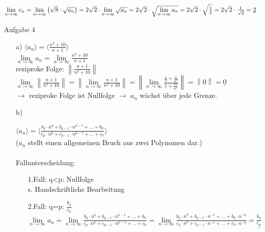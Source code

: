 \documentclass{scrreprt}
\begin{document}
\begin{enumerate}
{\begin{enumerate}
{                    $\lim \limits_{n \to \infty} c_n =
                    \lim \limits_{n \to \infty} \left( \sqrt{8} \cdot \sqrt{a_n}\right) =\\
                    2\sqrt{2} \cdot \lim \limits_{n \to \infty} \sqrt{a_n} =
                    2\sqrt{2} \cdot \sqrt{ \lim \limits_{n \to \infty} a_n } =\\
                    2\sqrt{2} \cdot \sqrt{\frac{1}{2}} =
                    2\sqrt{2} \cdot \frac{1}{\sqrt{2}} =
                    \underline{2}$\\
                }
            \end{enumerate}
        }\newpage
        \item[Aufgabe 4]{
            \begin{enumerate}
                \item [a)]{
                    $\langle a_n \rangle = \langle \frac{n^2 + 10}{n+1} \rangle$\\
                    $\lim \limits_{n \to \infty} a_n =
                    \lim \limits_{n \to \infty} \frac{n^2 + 10}{n+1}$\\
                    reziproke Folge: $\left\| \frac{n+1}{n^2 +10} \right\|$\\
                    $\lim \limits_{n \to \infty} \left\| \frac{n+1}{n^2 +10} \right\| =
                    \left\| \lim \limits_{n \to \infty} \frac{n+1}{n^2 +10} \right\| =
                    \left\| \lim \limits_{n \to \infty} \frac{\frac{1}{n}+\frac{1}{n^2}}{1 + \frac{10}{n^2}} \right\| =
                    \left\| 0 \right\| =
                    \underline{0}$\\
                    $\rightarrow$ reziproke Folge ist Nullfolge $\rightarrow$ $a_n$ wächst über jede Grenze.
                }
                \item[b)]{
                    $\langle a_n \rangle = \langle \frac{b_q \cdot n^q + b_{q-1} \cdot n^{q-1} + \dots + b_0} {c_p \cdot n^p + c_{p-1} \cdot n^{p-1} + \dots + c_0} \rangle$\\
                    ($a_n$ stellt einen allgemeinen Bruch aus zwei Polynomen dar.)\\\\
                    Fallunterscheidung:
                    \begin{enumerate}
                        \item [1.Fall:] q<p: Nullfolge\\ s. Handschriftliche Bearbeitung %
                        \item [2.Fall:] q=p: $\frac{b_q}{c_p}$\\
                        $\lim \limits_{n \to \infty} a_n =
                        \lim \limits_{n \to \infty} \frac{b_q \cdot n^q + b_{q-1} \cdot n^{q-1} + \dots + b_0} {c_p \cdot n^p + c_{p-1} \cdot n^{p-1} + \dots + c_0} =
                        \lim \limits_{n \to \infty} \frac{b_q \cdot n^0 + b_{q-1} \cdot n^{-1} + \dots + b_0 \cdot n^{-q}} {c_q \cdot n^0 + c_{q-1} \cdot n^{-1} + \dots + c_0\cdot n^{-q}} =
                        \underline{\frac{b_q}{c_p}}$


\end{enumerate}}
\end{enumerate}}
\end{enumerate}
\end{document}
